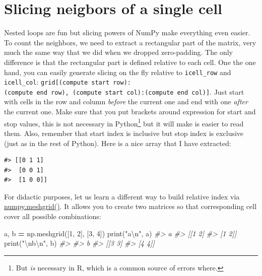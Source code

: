\documentclass[
]{book}
\newenvironment{Shaded}{\begin{snugshade}}{\end{snugshade}}
\newcommand{\BuiltInTok}[1]{#1}
\newcommand{\CharTok}[1]{\textcolor[rgb]{0.31,0.60,0.02}{#1}}
\newcommand{\CommentTok}[1]{\textcolor[rgb]{0.56,0.35,0.01}{\textit{#1}}}
\newcommand{\DecValTok}[1]{\textcolor[rgb]{0.00,0.00,0.81}{#1}}
\newcommand{\NormalTok}[1]{#1}
\newcommand{\OperatorTok}[1]{\textcolor[rgb]{0.81,0.36,0.00}{\textbf{#1}}}
\newcommand{\StringTok}[1]{\textcolor[rgb]{0.31,0.60,0.02}{#1}}
\begin{document}
\hypertarget{slicing-neigbors-of-a-single-cell}{%
\section{Slicing neigbors of a single cell}\label{slicing-neigbors-of-a-single-cell}}

Nested loops are fun but slicing powers of NumPy make everything even easier. To count the neighbors, we need to extract a rectangular part of the matrix, very much the same way that we did when we dropped zero-padding. The only difference is that the rectangular part is defined relative to each cell. One the one hand, you can easily generate slicing on the fly relative to \texttt{icell\_row} and \texttt{icell\_col}: \texttt{grid{[}(compute\ start\ row):(compute\ end\ row),\ (compute\ start\ col):(compute\ end\ col){]}}. Just start with cells in the row and column \emph{before} the current one and end with one \emph{after} the current one. Make sure that you put brackets around expression for start and stop values, this is not necessary in Python\footnote{But \emph{is} necessary in R, which is a common source of errors where.} but it will make is easier to read them. Also, remember that start index is inclusive but stop index is exclusive (just as in the rest of Python). Here is a nice array that I have extracted:

\begin{verbatim}
#> [[0 1 1]
#>  [0 0 1]
#>  [1 0 0]]
\end{verbatim}

For didactic purposes, let us learn a different way to build relative index via \href{https://numpy.org/doc/stable/reference/generated/numpy.meshgrid.html?highlight=meshgrid}{numpy.meshgrid()}. It allows you to create two matrices so that corresponding cell cover all possible combinations:

\begin{Shaded}
\begin{Highlighting}[]
\NormalTok{a, b }\OperatorTok{=}\NormalTok{ np.meshgrid([}\DecValTok{1}\NormalTok{, }\DecValTok{2}\NormalTok{], [}\DecValTok{3}\NormalTok{, }\DecValTok{4}\NormalTok{])}
\BuiltInTok{print}\NormalTok{(}\StringTok{"a}\CharTok{\textbackslash{}n}\StringTok{"}\NormalTok{, a)}
\CommentTok{\#\textgreater{} a}
\CommentTok{\#\textgreater{}  [[1 2]}
\CommentTok{\#\textgreater{}  [1 2]]}
\BuiltInTok{print}\NormalTok{(}\StringTok{"}\CharTok{\textbackslash{}n}\StringTok{b}\CharTok{\textbackslash{}n}\StringTok{"}\NormalTok{, b)}
\CommentTok{\#\textgreater{} }
\CommentTok{\#\textgreater{} b}
\CommentTok{\#\textgreater{}  [[3 3]}
\CommentTok{\#\textgreater{}  [4 4]]}
\end{Highlighting}
\end{Shaded}
\end{document}
